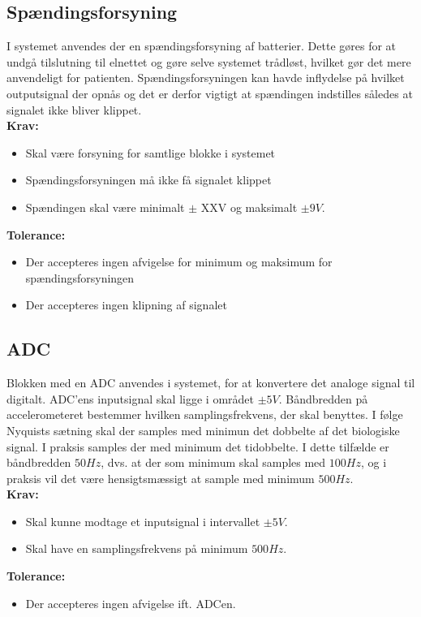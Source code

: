 \subsection{Spændingsforsyning}
I systemet anvendes der en spændingsforsyning af batterier. Dette gøres for at undgå tilslutning til elnettet og gøre selve systemet trådløst, hvilket gør det mere anvendeligt for patienten. Spændingsforsyningen kan havde inflydelse på hvilket outputsignal der opnås og det er derfor vigtigt at spændingen indstilles således at signalet ikke bliver klippet. \\
\noindent\textbf{Krav:}
\begin{itemize}
\item Skal være forsyning for samtlige blokke i systemet
\item Spændingsforsyningen må ikke få signalet klippet
\item Spændingen skal være minimalt $\pm$ XXV  og maksimalt $\pm9V$.
\end{itemize}
\noindent\textbf{Tolerance:}
\begin{itemize}
\item Der accepteres ingen afvigelse for minimum og maksimum for spændingsforsyningen
\item Der accepteres ingen klipning af signalet
\end{itemize}

\subsection{ADC}
Blokken med en ADC anvendes i systemet, for at konvertere det analoge signal til digitalt. %
ADC'ens inputsignal skal ligge i området $\pm5V$. Båndbredden på accelerometeret bestemmer hvilken samplingsfrekvens, der skal benyttes. I følge Nyquists sætning skal der samples med minimun det dobbelte af det biologiske signal. I praksis samples der med minimum det tidobbelte. I dette tilfælde er båndbredden $50Hz$, dvs. at der som minimum skal samples med $100Hz$, og i praksis vil det være hensigtsmæssigt at sample med minimum $500Hz$. \\
\textbf{Krav:}
\begin{itemize}
	\item Skal kunne modtage et inputsignal i intervallet $\pm 5 V$.
	\item Skal have en samplingsfrekvens på minimum $500Hz$.
\end{itemize}
\textbf{Tolerance:}
\begin{itemize}
	\item Der accepteres ingen afvigelse ift. ADCen.
\end{itemize}
